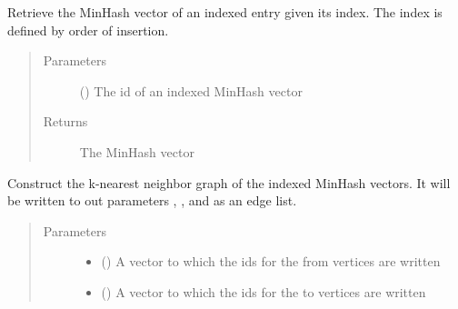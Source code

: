 \documentclass[letterpaper,10pt,english]{sphinxmanual}
\begin{document}
\begin{fulllineitems}
\begin{fulllineitems}
\label{\detokenize{documentation:tmap.LSHForest.get_hash}}
Retrieve the MinHash vector of an indexed entry given its index. The index is defined by order of insertion.
\begin{quote}\begin{description}
\item[{Parameters}] \leavevmode
{} () \textendash{} The id of an indexed MinHash vector

\item[{Returns}] \leavevmode
{} The MinHash vector

\end{description}\end{quote}

\end{fulllineitems}


\begin{fulllineitems}
\label{\detokenize{documentation:tmap.LSHForest.get_knn_graph}}
Construct the k-nearest neighbor graph of the indexed MinHash vectors. It will be written to out parameters , , and  as an edge list.
\begin{quote}\begin{description}
\item[{Parameters}] \leavevmode\begin{itemize}
\item {} 
 () \textendash{} A vector to which the ids for the from vertices are written

\item {} 
 () \textendash{} A vector to which the ids for the to vertices are written


\end{itemize}
\end{description}
\end{quote}
\end{fulllineitems}
\end{fulllineitems}
\end{document}

